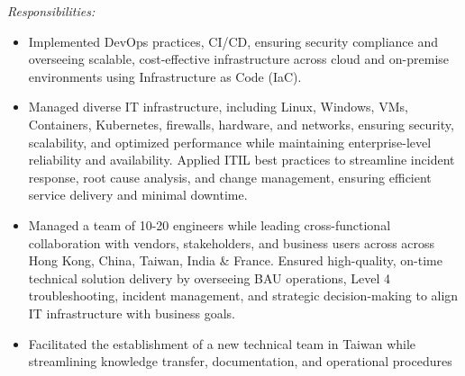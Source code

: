 \documentclass[11pt]{article}
\begin{document}
	\textit{Responsibilities:}
	\begin{itemize}
		\item Implemented DevOps practices, CI/CD, ensuring security compliance and overseeing scalable, cost-effective infrastructure across cloud and on-premise environments using Infrastructure as Code (IaC).
		\item Managed diverse IT infrastructure, including Linux, Windows, VMs, Containers, Kubernetes, firewalls, hardware, and networks, ensuring security, scalability, and optimized performance while maintaining enterprise-level reliability and availability. Applied ITIL best practices to streamline incident response, root cause analysis, and change management, ensuring efficient service delivery and minimal downtime.
		\item Managed a team of 10-20 engineers while leading cross-functional collaboration with vendors, stakeholders, and business users across across Hong Kong, China, Taiwan, India \& France. Ensured high-quality, on-time technical solution delivery by overseeing BAU operations, Level 4 troubleshooting, incident management, and strategic decision-making to align IT infrastructure with business goals.
		\item Facilitated the establishment of a new technical team in Taiwan while streamlining knowledge transfer, documentation, and operational procedures
	\end{itemize}
	
\end{document}
